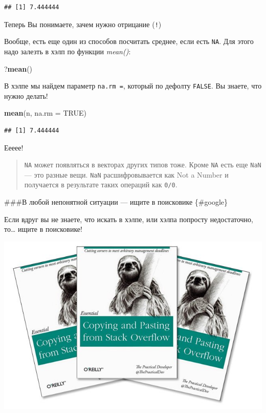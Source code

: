 \documentclass[]{book}
\newenvironment{Shaded}{\begin{snugshade}}{\end{snugshade}}
\newcommand{\DataTypeTok}[1]{\textcolor[rgb]{0.13,0.29,0.53}{#1}}
\newcommand{\KeywordTok}[1]{\textcolor[rgb]{0.13,0.29,0.53}{\textbf{#1}}}
\newcommand{\NormalTok}[1]{#1}
\newcommand{\OtherTok}[1]{\textcolor[rgb]{0.56,0.35,0.01}{#1}}
\begin{document}
\begin{verbatim}
## [1] 7.444444
\end{verbatim}

Теперь Вы понимаете, зачем нужно отрицание (\texttt{!})

Вообще, есть еще один из способов посчитать среднее, если есть \texttt{NA}. Для этого надо залезть в хэлп по функции \emph{mean()}:

\begin{Shaded}
\begin{Highlighting}[]
\NormalTok{?}\KeywordTok{mean}\NormalTok{()}
\end{Highlighting}
\end{Shaded}

В хэлпе мы найдем параметр \texttt{na.rm\ =}, который по дефолту \texttt{FALSE}. Вы знаете, что нужно делать!

\begin{Shaded}
\begin{Highlighting}[]
\KeywordTok{mean}\NormalTok{(n, }\DataTypeTok{na.rm =} \OtherTok{TRUE}\NormalTok{)}
\end{Highlighting}
\end{Shaded}

\begin{verbatim}
## [1] 7.444444
\end{verbatim}

Еееее!

\begin{quote}
\texttt{NA} может появляться в векторах других типов тоже. Кроме \texttt{NA} есть еще \texttt{NaN} --- это разные вещи. \texttt{NaN} расшифровывается как Not a Number и получается в результате таких операций как \texttt{0/0}.
\end{quote}

\#\#\#В любой непонятной ситуации --- ищите в поисковике \{\#google\}

Если вдруг вы не знаете, что искать в хэлпе, или хэлпа попросту недостаточно, то\ldots{} ищите в поисковике!

\includegraphics{images/2AmXWgVoULk.jpg}
\end{document}
